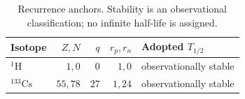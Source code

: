 \begin{table}[htbp]
\centering\small
\begin{tabular}{lrrrl}
\toprule
Isotope & $Z,N$ & $q$ & $r_p,r_n$ & Adopted $T_{1/2}$ \\
\midrule
$^{1}\mathrm{H}$ & $1,0$ & $0$ & $1,0$ & observationally stable \\
$^{133}\mathrm{Cs}$ & $55,78$ & $27$ & $1,24$ & observationally stable \\
\bottomrule
\end{tabular}
\caption{Recurrence anchors. Stability is an observational classification; no infinite half-life is assigned.}
\label{tab:isotope-anchors}
\end{table}
